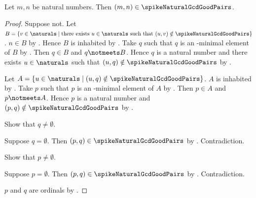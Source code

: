 \begin{theorem}\label{spike15_every_natural_pair_is_gcd_good}
    Let $m,n$ be natural numbers.
    Then $(m,n)\in\spikeNaturalGcdGoodPairs$.
\end{theorem}
\begin{proof}
    Suppose not.
    Let $B=\{v\in\naturals\mid
        \text{there exists $u\in\naturals$ such that
            $(u,v)\notin\spikeNaturalGcdGoodPairs$}\}$.
    $n\in B$ by \auto.
    Hence $B$ is inhabited by \auto.
    Take $q$ such that $q$ is an \in-minimal element of $B$
        by .
    Then $q\in B$ and $q\notmeets B$.
    Hence $q$ is a natural number and
        there exists $u\in\naturals$ such that
            $(u,q)\notin\spikeNaturalGcdGoodPairs$ by \auto.

    Let $A=\{u\in\naturals\mid
        (u,q)\notin\spikeNaturalGcdGoodPairs\}$.
    $A$ is inhabited by \auto.
    Take $p$ such that $p$ is an \in-minimal element of $A$
        by .
    Then $p\in A$ and $p\notmeets A$.
    Hence $p$ is a natural number and
        $(p,q)\notin\spikeNaturalGcdGoodPairs$ by \auto.

    Show that $q\neq\emptyset$.
    \begin{subproof}
        Suppose $q=\emptyset$.
        Then $(p,q)\in\spikeNaturalGcdGoodPairs$
            by .
        Contradiction.
    \end{subproof}
    Show that $p\neq\emptyset$.
    \begin{subproof}
        Suppose $p=\emptyset$.
        Then $(p,q)\in\spikeNaturalGcdGoodPairs$
            by .
        Contradiction.
    \end{subproof}
    $p$ and $q$ are ordinals by .


\end{proof}
